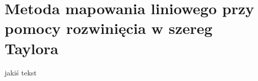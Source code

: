 
\section{Metoda mapowania liniowego przy pomocy rozwinięcia w szereg Taylora}
\label{sec:Taylor}
jakiś tekst